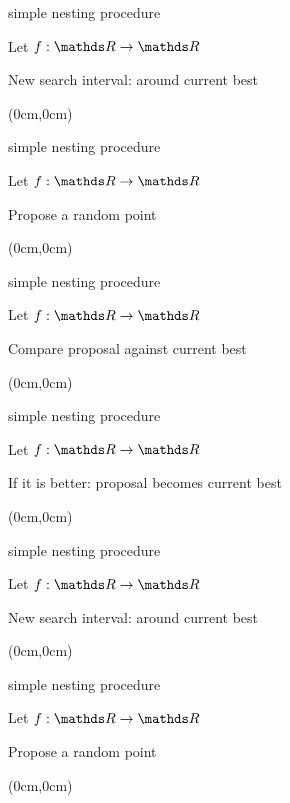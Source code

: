 \documentclass[11pt,compress,t,notes=noshow, xcolor=table]{beamer}
\begin{document}
\begin{framei}{simple nesting procedure}
\item Let $f: \R \to \R$
\item New search interval: around current best
\begin{textblock*}{\linewidth}(0cm,0cm)
\end{textblock*}
\end{framei}

\begin{framei}{simple nesting procedure}
\item Let $f: \R \to \R$
\item Propose a random point
\begin{textblock*}{\linewidth}(0cm,0cm)
\end{textblock*}
\end{framei}

\begin{framei}{simple nesting procedure}
\item Let $f: \R \to \R$
\item Compare proposal against current best
\begin{textblock*}{\linewidth}(0cm,0cm)
\end{textblock*}
\end{framei}

\begin{framei}{simple nesting procedure}
\item Let $f: \R \to \R$
\item If it is better: proposal becomes current best
\begin{textblock*}{\linewidth}(0cm,0cm)
\end{textblock*}
\end{framei}

\begin{framei}{simple nesting procedure}
\item Let $f: \R \to \R$
\item New search interval: around current best
\begin{textblock*}{\linewidth}(0cm,0cm)
\end{textblock*}
\end{framei}

\begin{framei}{simple nesting procedure}
\item Let $f: \R \to \R$
\item Propose a random point
\begin{textblock*}{\linewidth}(0cm,0cm)
\end{textblock*}
\end{framei}
\end{document}

